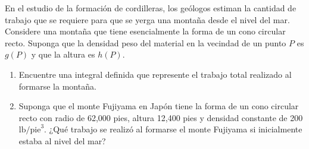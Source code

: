 \item En el estudio de la formación de cordilleras, los geólogos estiman la cantidad de trabajo que se requiere para que se yerga una montaña desde el nivel del mar. Considere una montaña que tiene esencialmente la forma de un cono circular recto. Suponga que la densidad peso del material en la vecindad de un punto $P$ es $g(P)$ y que la altura es $h(P)$.
    \begin{enumerate}
        \item[(a)] Encuentre una integral definida que represente el trabajo total realizado al formarse la montaña.
        \item[(b)] Suponga que el monte Fujiyama en Japón tiene la forma de un cono circular recto con radio de 62,000 pies, altura 12,400 pies y densidad constante de 200 $\text{lb/pie}^3$. ¿Qué trabajo se realizó al formarse el monte Fujiyama si inicialmente estaba al nivel del mar?
    \end{enumerate}

    \begin{center}
    \end{center}
